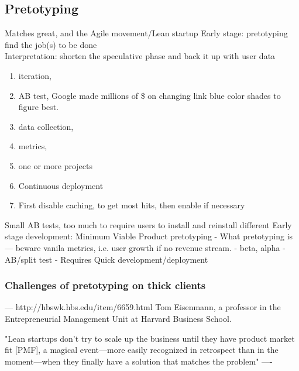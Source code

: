 \documentclass[a4paper,10pt]{article}
\begin{document}
\subsection{Pretotyping}
Matches great, and the Agile movement/Lean startup
Early stage: pretotyping find the job(s) to be done
\\
Interpretation: shorten the speculative phase and back it up with user data
\begin{enumerate}
\item iteration, 
\item AB test, Google made millions of \$ on changing link blue color shades to figure best.
\item data collection, 
\item metrics, 
\item one or more projects
\item Continuous deployment
\item First disable caching, to get most hits, then enable if necessary
\end{enumerate}

Small AB tests, too much to require users to install and reinstall different
Early stage development: Minimum Viable Product pretotyping
 - What pretotyping is
  --- beware vanila metrics, i.e. user growth if no revenue stream.
 - beta, alpha
 - AB/split test
 - Requires Quick development/deployment
 



\subsubsection{Challenges of pretotyping on thick clients}

---
http://hbswk.hbs.edu/item/6659.html
Tom Eisenmann, a professor in the Entrepreneurial Management Unit at Harvard Business School.

"Lean startups don't try to scale up the business until they have product market fit [PMF], a magical event—more 
 easily recognized in retrospect than in the moment—when they finally have a solution that matches the problem"
----
\end{document}
